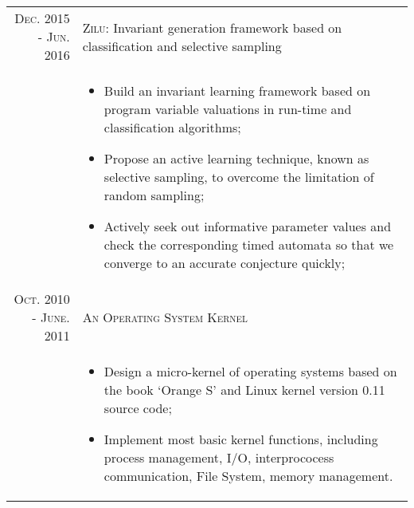 \documentclass[a4paper,10pt]{article}
\begin{document}
\begin{tabular}{rp{11cm}}
\textsc{Dec.} 2015 - \textsc{Jun.} 2016 & \textsc{Zilu:}   \footnotesize{Invariant generation framework based on classification and selective sampling}\\
&\footnotesize{
\begin{itemize}
	\item Build an invariant learning framework based on program variable valuations in run-time and classification algorithms;
	\item Propose an active learning technique, known as selective sampling, to overcome the limitation of random sampling;
	\item Actively seek out informative parameter values and check the corresponding timed automata so that we converge to an accurate conjecture quickly;
\end{itemize}
}\\


\textsc{Oct.} 2010 - \textsc{June.} 2011 & \textsc{An Operating System Kernel} \\
&\footnotesize{
\begin{itemize}
	\item Design a micro-kernel of operating systems based on the book `Orange S' and Linux kernel version 0.11 source code;
	\item Implement most basic kernel functions, including process management, I/O, interprococess communication, File System, memory management.
\end{itemize}
} \\
\end{tabular}
\end{document}
